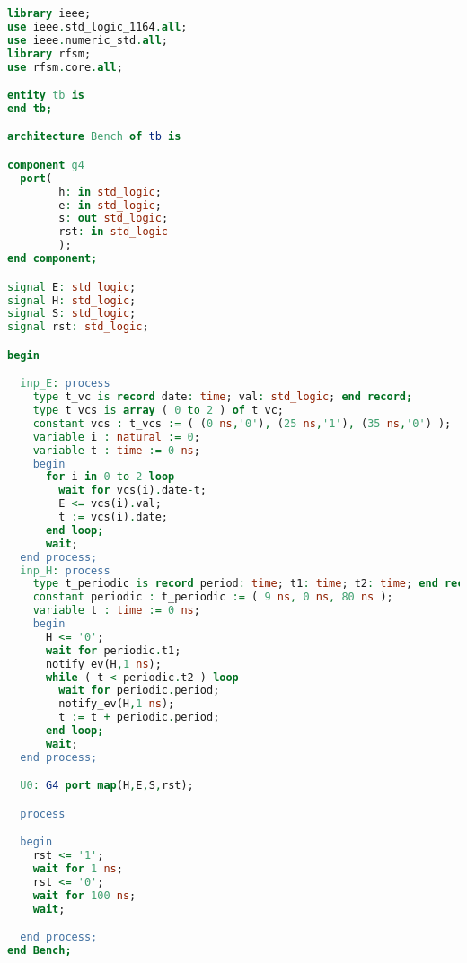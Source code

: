 \begin{lstlisting}[language=VHDL,frame=single,numbers=none,basicstyle=\small,caption=File tb.vhd]
library ieee;
use ieee.std_logic_1164.all;	   
use ieee.numeric_std.all;
library rfsm;
use rfsm.core.all;

entity tb is
end tb;

architecture Bench of tb is

component g4 
  port(
        h: in std_logic;
        e: in std_logic;
        s: out std_logic;
        rst: in std_logic
        );
end component;

signal E: std_logic;
signal H: std_logic;
signal S: std_logic;
signal rst: std_logic;

begin

  inp_E: process
    type t_vc is record date: time; val: std_logic; end record;
    type t_vcs is array ( 0 to 2 ) of t_vc;
    constant vcs : t_vcs := ( (0 ns,'0'), (25 ns,'1'), (35 ns,'0') );
    variable i : natural := 0;
    variable t : time := 0 ns;
    begin
      for i in 0 to 2 loop
        wait for vcs(i).date-t;
        E <= vcs(i).val;
        t := vcs(i).date;
      end loop;
      wait;
  end process;
  inp_H: process
    type t_periodic is record period: time; t1: time; t2: time; end record;
    constant periodic : t_periodic := ( 9 ns, 0 ns, 80 ns );
    variable t : time := 0 ns;
    begin
      H <= '0';
      wait for periodic.t1;
      notify_ev(H,1 ns);
      while ( t < periodic.t2 ) loop
        wait for periodic.period;
        notify_ev(H,1 ns);
        t := t + periodic.period;
      end loop;
      wait;
  end process;

  U0: G4 port map(H,E,S,rst);

  process

  begin
    rst <= '1';
    wait for 1 ns;
    rst <= '0';
    wait for 100 ns;
    wait;

  end process;
end Bench;
\end{lstlisting}

